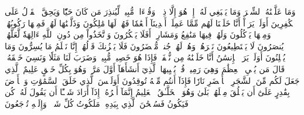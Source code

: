 وَمَا عَلَّمۡنَٰهُ ٱلشِّعۡرَ وَمَا يَنۢبَغِي لَهُۥٓۚ إِنۡ هُوَ إِلَّا ذِكۡرٞ وَقُرۡءَانٞ مُّبِينٞ
لِّيُنذِرَ مَن كَانَ حَيّٗا وَيَحِقَّ ٱلۡقَوۡلُ عَلَى ٱلۡكَٰفِرِينَ
أَوَلَمۡ يَرَوۡاْ أَنَّا خَلَقۡنَا لَهُم مِّمَّا عَمِلَتۡ أَيۡدِينَآ أَنۡعَٰمٗا فَهُمۡ لَهَا مَٰلِكُونَ
وَذَلَّلۡنَٰهَا لَهُمۡ فَمِنۡهَا رَكُوبُهُمۡ وَمِنۡهَا يَأۡكُلُونَ
وَلَهُمۡ فِيهَا مَنَٰفِعُ وَمَشَارِبُۚ أَفَلَا يَشۡكُرُونَ
وَٱتَّخَذُواْ مِن دُونِ ٱللَّهِ ءَالِهَةٗ لَّعَلَّهُمۡ يُنصَرُونَ
لَا يَسۡتَطِيعُونَ نَصۡرَهُمۡ وَهُمۡ لَهُمۡ جُندٞ مُّحۡضَرُونَ
فَلَا يَحۡزُنكَ قَوۡلُهُمۡۘ إِنَّا نَعۡلَمُ مَا يُسِرُّونَ وَمَا يُعۡلِنُونَ
أَوَلَمۡ يَرَ ٱلۡإِنسَٰنُ أَنَّا خَلَقۡنَٰهُ مِن نُّطۡفَةٖ فَإِذَا هُوَ خَصِيمٞ مُّبِينٞ
وَضَرَبَ لَنَا مَثَلٗا وَنَسِيَ خَلۡقَهُۥۖ قَالَ مَن يُحۡيِ ٱلۡعِظَٰمَ وَهِيَ رَمِيمٞ
قُلۡ يُحۡيِيهَا ٱلَّذِيٓ أَنشَأَهَآ أَوَّلَ مَرَّةٖۖ وَهُوَ بِكُلِّ خَلۡقٍ عَلِيمٌ
ٱلَّذِي جَعَلَ لَكُم مِّنَ ٱلشَّجَرِ ٱلۡأَخۡضَرِ نَارٗا فَإِذَآ أَنتُم مِّنۡهُ تُوقِدُونَ
أَوَلَيۡسَ ٱلَّذِي خَلَقَ ٱلسَّمَٰوَٰتِ وَٱلۡأَرۡضَ بِقَٰدِرٍ عَلَىٰٓ أَن يَخۡلُقَ مِثۡلَهُمۚ بَلَىٰ وَهُوَ ٱلۡخَلَّـٰقُ ٱلۡعَلِيمُ
إِنَّمَآ أَمۡرُهُۥٓ إِذَآ أَرَادَ شَيۡـًٔا أَن يَقُولَ لَهُۥ كُن فَيَكُونُ
فَسُبۡحَٰنَ ٱلَّذِي بِيَدِهِۦ مَلَكُوتُ كُلِّ شَيۡءٖ وَإِلَيۡهِ تُرۡجَعُونَ